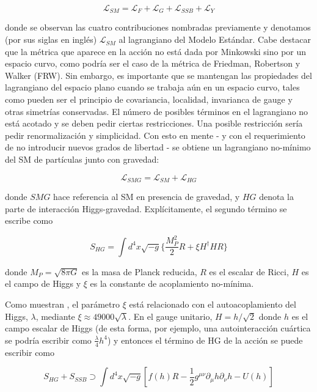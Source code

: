 \begin{equation}\label{GWS}
\mathcal{L}_{SM}=\mathcal{L}_{F}+\mathcal{L}_{G}+\mathcal{L}_{SSB}+\mathcal{L}_{Y}
\end{equation}


donde se observan las cuatro contribuciones nombradas previamente y denotamos (por sus siglas en inglés) $\mathcal{L}_{SM}$ al lagrangiano del Modelo Estándar. Cabe destacar que la métrica que aparece en la acción no está dada por Minkowski sino por un espacio curvo, como podría ser el caso de la métrica de Friedman, Robertson y Walker (FRW). Sin embargo, es importante que se mantengan las propiedades del lagrangiano del espacio plano cuando se trabaja aún en un espacio curvo, tales como pueden ser el principio de covariancia, localidad, invarianca de gauge y otras simetrías conservadas. El número de posibles términos en el lagrangiano no está acotado y se deben pedir ciertas restricciones. Una posible restricción sería pedir renormalización y simplicidad. Con esto en mente - y con el requerimiento de no introducir nuevos grados de libertad - se obtiene un lagrangiano no-mínimo del SM de partículas junto con gravedad:


\begin{equation}
\mathcal{L}_{SMG}=\mathcal{L}_{SM}+\mathcal{L}_{HG}
\label{rbf4}
\end{equation}

donde $SMG$ hace referencia al SM en presencia de gravedad, y $HG$ denota la parte de interacción Higgs-gravedad. Explícitamente, el segundo término se escribe como

\begin{equation}
S_{HG}=\int d^4x \sqrt{-g}\bigg\{ \frac{M^2_P}{2}R + \xi H^{\dag} HR\bigg\}
\end{equation}

donde $M_P=\sqrt{8\pi G}$ es la masa de Planck reducida, $R$ es el escalar de Ricci, $H$ es el campo de Higgs y $\xi$ es la constante de acoplamiento no-mínima.

Como muestran \citep{2008PhLB..659..703B}, el parámetro $\xi$ está relacionado con el autoacoplamiento del Higgs, $\lambda$, mediante $\xi \approx 49000 \sqrt{\lambda}$. En el gauge unitario, $H=h/\sqrt{2}$ donde $h$ es el campo escalar de Higgs (de esta forma, por ejemplo, una autointeracción cuártica se podría escribir como $\frac{\lambda}{4}h^4$) y entonces el término de HG de la acción se puede escribir como


\begin{equation}
S_{HG}+S_{SSB} \supset \int d^{4}x \sqrt{-g} \left[ f(h) R- \frac{1}{2} g^{\mu \nu} \partial _{\mu}h \partial_{\nu} h-U(h) \right]
\label{rbf5}
\end{equation}



